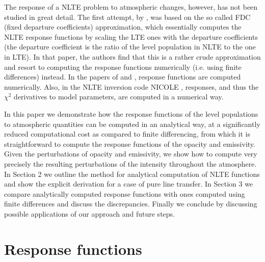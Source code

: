 \documentclass{aa}
\begin{document}
The response of a NLTE problem to atmospheric changes, however, has not been studied in great detail. The first attempt, by \citet{HectorI}, was based on the so called FDC (fixed departure coefficients) approximation, which essentially computes the NLTE response functions by scaling the LTE ones with the departure coefficients (the departure coefficient is the ratio of the level population in NLTE to the one in LTE). In that paper, the authors find that this is a rather crude approximation and resort to computing the response functions numerically (i.e. using finite differences) instead. In the papers of \citet{Hector_halpha} and \citet{Han06}, response functions are computed numerically. Also, in the NLTE inversion code NICOLE \citep{NICOLE}, responses, and thus the $\chi^2$ derivatives to model parameters, are computed in a numerical way.

In this paper we demonstrate how the response functions of the level populations to atmospheric quantities can be computed in an analytical way, at a significantly reduced computational cost as compared to finite differencing, from which it is straightforward to compute the response functions of the opacity and emissivity. Given the perturbations of opacity and emissivity, we show how to compute very precisely the resulting perturbations of the intensity throughout the atmosphere. In Section 2 we outline the method for analytical computation of NLTE functions and show the explicit derivation for a case of pure line transfer. In Section 3 we compare analytically computed response functions with ones computed using finite differences and discuss the discrepancies. Finally we conclude by discussing possible applications of our approach and future steps. 

\section{Response functions}
\label{concept}
\end{document}
